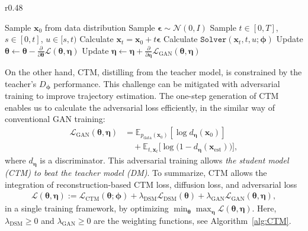 \documentclass{article} \usepackage{iclr2024_coNFErence,times}
\theoremstyle{definition}
\theoremstyle{remark}
\begin{document}
\begin{wrapfigure}{r}{0.48\textwidth}
\vskip -0.12in
\begin{minipage}{0.48\textwidth}
\begin{algorithm}[H]
    \centering
    \caption{CTM Training}\label{alg:CTM}
    \begin{algorithmic}[1]
        \Repeat
        \State Sample $\mathbf{x}_{0}$ from data distribution
        \State Sample $\bm{\epsilon}\sim\mathcal{N}(0,I)$
        \State Sample $t\in[0,T]$, $s\in[0,t]$, $u\in[s,t)$
        \State Calculate $\mathbf{x}_{t}=\mathbf{x}_{0}+t\bm{\epsilon}$
        \State Calculate $\texttt{Solver}(\mathbf{x}_t, t,u;\bm{\phi})$
        \State Update $\bm{\theta}\leftarrow\bm{\theta}-\frac{\partial}{\partial\bm{\theta}}\mathcal{L}(\bm{\theta},\bm{\eta})$
        \State Update $\bm{\eta}\leftarrow \bm{\eta}+\frac{\partial}{\partial\bm{\eta}}\mathcal{L}_{\text{GAN}}(\bm{\theta},\bm{\eta})$
    \end{algorithmic}
\end{algorithm}
\end{minipage}
\end{wrapfigure}
On the other hand, CTM, distilling from the teacher model, is constrained by the teacher's $D_{\bm{\phi}}$ performance. This challenge can be mitigated with adversarial training to improve trajectory estimation. The one-step generation of CTM enables us to calculate the adversarial loss efficiently, in the similar way of conventional GAN training: 
\begin{align*}
    \mathcal{L}_{\text{GAN}}(\bm{\theta},\bm{\eta})&=\mathbb{E}_{p_{\text{data}}(\mathbf{x}_{0})}[\log{d_{\bm{\eta}}(\mathbf{x}_{0})}]\\
    &\quad+\mathbb{E}_{t,\mathbf{x}_{t}}\big[\log{\big(1-d_{\bm{\eta}}(\mathbf{x}_{\text{est}})\big)}\big],
\end{align*}
where $d_{\bm{\eta}}$ is a discriminator. This adversarial training allows \emph{the student model (CTM) to beat the teacher model (DM)}. To summarize, CTM allows the integration of  reconstruction-based CTM loss, diffusion loss, and adversarial loss
\begin{align}\label{eq:ultimate_loss}
    \mathcal{L}(\bm{\theta},\bm{\eta}):=\mathcal{L}_{\text{CTM}}(\bm{\theta};\bm{\phi})+\lambda_{\text{DSM}}\mathcal{L}_{\text{DSM}}(\bm{\theta})+\lambda_{\text{GAN}}\mathcal{L}_{\text{GAN}}(\bm{\theta},\bm{\eta}),
\end{align}
in a single training framework, by optimizing $\min_{\bm{\theta}}\max_{\bm{\eta}}\mathcal{L}(\bm{\theta},\bm{\eta})$. Here, $\lambda_{\text{DSM}}\geq 0$ and $\lambda_{\text{GAN}}\geq 0$ are the weighting functions, see Algorithm~\ref{alg:CTM}.
\end{document}
